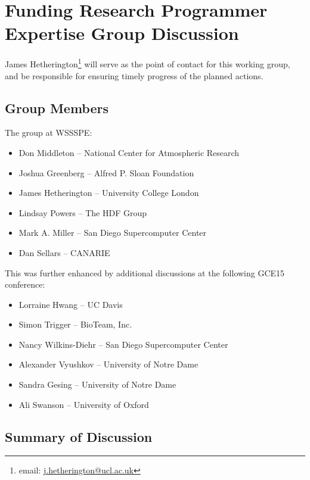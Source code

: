 \section{Funding Research Programmer Expertise Group Discussion}
\label{sec:appendix_funding_spec_expert}

James Hetherington\footnote{email:
\href{mailto:j.hetherington@ucl.ac.uk}{j.hetherington@ucl.ac.uk}} will serve as
the point of contact for this working group, and be responsible for ensuring
timely progress of the planned actions.

\subsection{Group Members}

The group at WSSSPE:

\begin{itemize}
\item Don Middleton -- National Center for Atmospheric Research
\item Joshua Greenberg -- Alfred P. Sloan Foundation
\item James Hetherington -- University College London
\item Lindsay Powers -- The HDF Group
\item Mark A. Miller -- San Diego Supercomputer Center
\item Dan Sellars -- CANARIE
\end{itemize}

This was further enhanced by additional discussions at the following
GCE15 conference:
  
\begin{itemize}
\item Lorraine Hwang -- UC Davis
\item Simon Trigger -- BioTeam, Inc.
\item Nancy Wilkins-Diehr -- San Diego Supercomputer Center
\item Alexander Vyushkov -- University of Notre Dame
\item Sandra Gesing -- University of Notre Dame
\item Ali Swanson -- University of Oxford

\end{itemize}

\subsection{Summary of Discussion}


